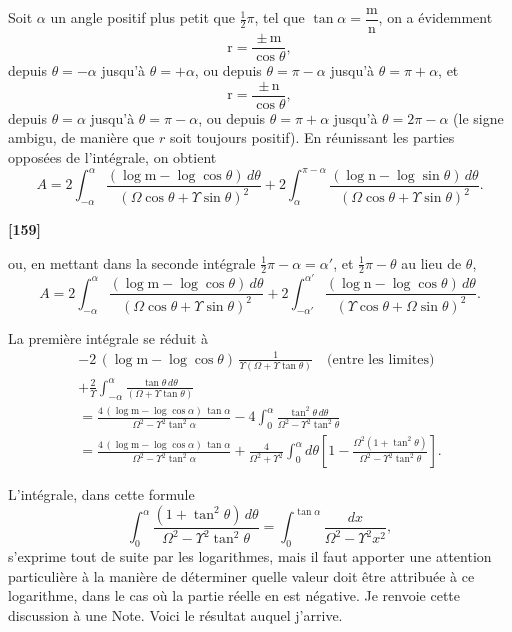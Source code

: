 \documentclass[11pt,a4paper]{article}
\begin{document}
Soit $\alpha$ un angle positif plus petit que $\tfrac{1}{2}\pi$, tel que $\tan\alpha = \dfrac{\mathrm{m}}{\mathrm{n}}$, on a \'evidemment
\[\mathrm{r} = \frac{\pm\, \mathrm{m}}{\cos\theta},\]
depuis $\theta = -\alpha$ jusqu'\`a $\theta = +\alpha$, ou depuis $\theta = \pi - \alpha$ jusqu'\`a $\theta = \pi + \alpha$, et
\[\mathrm{r} = \frac{\pm\, \mathrm{n}}{\cos\theta},\]
depuis $\theta = \alpha$ jusqu'\`a $\theta = \pi - \alpha$, ou depuis $\theta = \pi + \alpha$ jusqu'\`a $\theta = 2\pi - \alpha$ (le signe ambigu,
de mani\`ere que $r$ soit toujours positif). En r\'eunissant les parties oppos\'ees de l'int\'egrale,
on obtient
\[A = 2\int_{-\alpha}^{\alpha} \frac{(\log \mathrm{m} - \log\cos\theta)\, d\theta}{(\Omega\cos\theta + \Upsilon\sin\theta)^2}
+ 2\int_{\alpha}^{\pi-\alpha} \frac{(\log \mathrm{n} - \log\sin\theta)\, d\theta}{(\Omega\cos\theta + \Upsilon\sin\theta)^2}.\]

\textbf{[159]}

ou, en mettant dans la seconde int\'egrale $\tfrac{1}{2}\pi - \alpha = \alpha'$, et $\tfrac{1}{2}\pi - \theta$ au lieu de $\theta$,
\[A = 2\int_{-\alpha}^{\alpha} \frac{(\log \mathrm{m} - \log\cos\theta)\, d\theta}{(\Omega\cos\theta + \Upsilon\sin\theta)^2}
+ 2\int_{-\alpha'}^{\alpha'} \frac{(\log \mathrm{n} - \log\cos\theta)\, d\theta}{(\Upsilon\cos\theta + \Omega\sin\theta)^2}.\]

La premi\`ere int\'egrale se r\'eduit \`a
\begin{multline*}
-2\, (\log \mathrm{m} - \log\cos\theta)\, \frac{1}{\Upsilon(\Omega + \Upsilon\tan\theta)} \quad \text{(entre les limites)}\\
+ \frac{2}{\Upsilon} \int_{-\alpha}^{\alpha} \frac{\tan\theta\, d\theta}{(\Omega + \Upsilon\tan\theta)}\\
= \frac{4\, (\log \mathrm{m} - \log\cos\alpha)\, \tan\alpha}{\Omega^2 - \Upsilon^2\tan^2\alpha}
- 4\int_0^{\alpha} \frac{\tan^2\theta\, d\theta}{\Omega^2 - \Upsilon^2\tan^2\theta}\\
= \frac{4\, (\log \mathrm{m} - \log\cos\alpha)\, \tan\alpha}{\Omega^2 - \Upsilon^2\tan^2\alpha}
+ \frac{4}{\Omega^2 + \Upsilon^2} \int_0^{\alpha} d\theta \left[1 - \frac{\Omega^2(1 + \tan^2\theta)}{\Omega^2 - \Upsilon^2\tan^2\theta}\right].
\end{multline*}

L'int\'egrale, dans cette formule
\[\int_0^{\alpha} \frac{(1 + \tan^2\theta)\, d\theta}{\Omega^2 - \Upsilon^2\tan^2\theta}
= \int_0^{\tan\alpha} \frac{dx}{\Omega^2 - \Upsilon^2 x^2},\]
s'exprime tout de suite par les logarithmes, mais il faut apporter une attention
particuli\`ere \`a la mani\`ere de d\'eterminer quelle valeur doit \^etre attribu\'ee \`a ce logarithme,
dans le cas o\`u la partie r\'eelle en est n\'egative. Je renvoie cette discussion \`a une
Note. Voici le r\'esultat auquel j'arrive.
\end{document}
